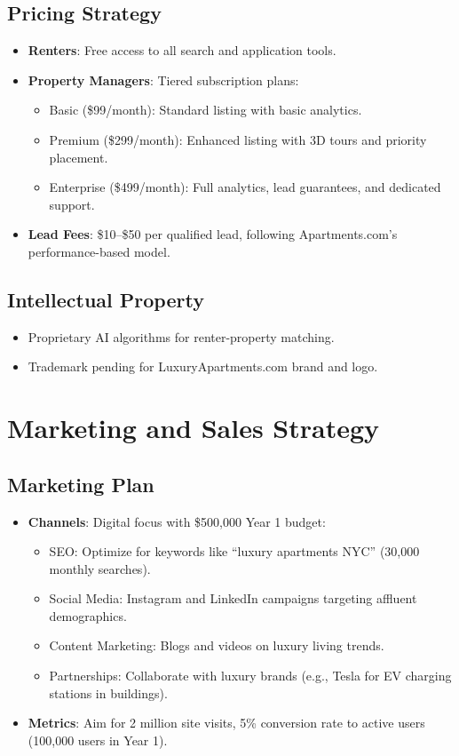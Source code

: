 \documentclass[12pt]{article}
\begin{document}
\subsection{Pricing Strategy}
\begin{itemize}
    \item \textbf{Renters}: Free access to all search and application tools.
    \item \textbf{Property Managers}: Tiered subscription plans:
    \begin{itemize}
        \item Basic (\$99/month): Standard listing with basic analytics.
        \item Premium (\$299/month): Enhanced listing with 3D tours and priority placement.
        \item Enterprise (\$499/month): Full analytics, lead guarantees, and dedicated support.
    \end{itemize}
    \item \textbf{Lead Fees}: \$10--\$50 per qualified lead, following Apartments.com's performance-based model.
\end{itemize}

\subsection{Intellectual Property}
\begin{itemize}
    \item Proprietary AI algorithms for renter-property matching.
    \item Trademark pending for LuxuryApartments.com brand and logo.
\end{itemize}

\section{Marketing and Sales Strategy}
\subsection{Marketing Plan}
\begin{itemize}
    \item \textbf{Channels}: Digital focus with \$500,000 Year 1 budget:
    \begin{itemize}
        \item SEO: Optimize for keywords like ``luxury apartments NYC'' (30,000 monthly searches).
        \item Social Media: Instagram and LinkedIn campaigns targeting affluent demographics.
        \item Content Marketing: Blogs and videos on luxury living trends.
        \item Partnerships: Collaborate with luxury brands (e.g., Tesla for EV charging stations in buildings).
    \end{itemize}
    \item \textbf{Metrics}: Aim for 2 million site visits, 5\% conversion rate to active users (100,000 users in Year 1).
\end{itemize}
\end{document}
